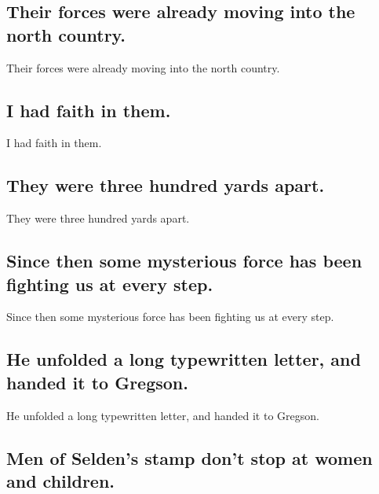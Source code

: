 \documentclass[]{article}
\begin{document}
\hypertarget{their-forces-were-already-moving-into-the-north-country.}{%
\subsection{Their forces were already moving into the north
country.}\label{their-forces-were-already-moving-into-the-north-country.}}

Their forces were already moving into the north country.

\hypertarget{i-had-faith-in-them.}{%
\subsection{I had faith in them.}\label{i-had-faith-in-them.}}

I had faith in them.

\hypertarget{they-were-three-hundred-yards-apart.}{%
\subsection{They were three hundred yards
apart.}\label{they-were-three-hundred-yards-apart.}}

They were three hundred yards apart.

\hypertarget{since-then-some-mysterious-force-has-been-fighting-us-at-every-step.}{%
\subsection{Since then some mysterious force has been fighting us at
every
step.}\label{since-then-some-mysterious-force-has-been-fighting-us-at-every-step.}}

Since then some mysterious force has been fighting us at every step.

\hypertarget{he-unfolded-a-long-typewritten-letter-and-handed-it-to-gregson.}{%
\subsection{He unfolded a long typewritten letter, and handed it to
Gregson.}\label{he-unfolded-a-long-typewritten-letter-and-handed-it-to-gregson.}}

He unfolded a long typewritten letter, and handed it to Gregson.

\hypertarget{men-of-seldens-stamp-dont-stop-at-women-and-children.}{%
\subsection{Men of Selden's stamp don't stop at women and
children.}\label{men-of-seldens-stamp-dont-stop-at-women-and-children.}}
\end{document}
